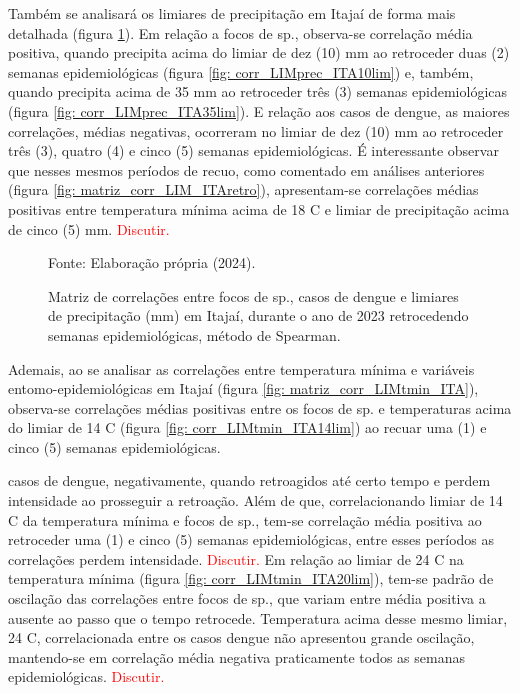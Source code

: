 \documentclass[
	12pt,				%
	openright,			%
	oneside,			%
	a4paper,			%
	english,			%
	french,				%
	spanish,			%
	brazil				%
	dvipsnames, table]{abntex2}
\begin{document}
\indent Também se analisará os limiares de precipitação em Itajaí de forma mais detalhada (figura \ref{fig: matriz_corr_LIMprec_ITA}). Em relação a focos de  sp., observa-se correlação média positiva, quando precipita acima do limiar de dez (10) mm ao retroceder duas (2) semanas epidemiológicas (figura \ref{fig: corr_LIMprec_ITA10lim}) e, também, quando precipita acima de 35 mm ao retroceder três (3) semanas epidemiológicas (figura \ref{fig: corr_LIMprec_ITA35lim}). E relação aos casos de dengue, as maiores correlações, médias negativas, ocorreram no limiar de dez (10) mm ao retroceder três (3), quatro (4) e cinco (5) semanas epidemiológicas. É interessante observar que nesses mesmos períodos de recuo, como comentado em análises anteriores (figura \ref{fig: matriz_corr_LIM_ITAretro}), apresentam-se correlações médias positivas entre temperatura mínima acima de 18 C e limiar de precipitação acima de cinco (5) mm. \textcolor{red}{Discutir.}

\begin{figure}[htbp]
    \begin{center}
    \caption{Matriz de correlações entre focos de  sp., casos de dengue e limiares de precipitação (mm) em Itajaí, durante o ano de 2023 retrocedendo semanas epidemiológicas, método de Spearman.}
    \label{fig: matriz_corr_LIMprec_ITA}
        \hfill
    \end{center}
    \small{Fonte: Elaboração própria (2024).}
\end{figure}

\indent Ademais, ao se analisar as correlações entre temperatura mínima e variáveis entomo-epidemiológicas em Itajaí (figura \ref{fig: matriz_corr_LIMtmin_ITA}), observa-se correlações médias positivas entre os focos de  sp. e temperaturas acima do limiar de 14 C (figura \ref{fig: corr_LIMtmin_ITA14lim}) ao recuar uma (1) e cinco (5) semanas epidemiológicas.


casos de dengue, negativamente, quando retroagidos até certo tempo e perdem intensidade ao prosseguir a retroação. Além de que, correlacionando limiar de 14 C da temperatura mínima e focos de  sp., tem-se correlação média positiva ao retroceder uma (1) e cinco (5) semanas epidemiológicas, entre esses períodos as correlações perdem intensidade. \textcolor{red}{Discutir.} Em relação ao limiar de 24 C na temperatura mínima (figura \ref{fig: corr_LIMtmin_ITA20lim}), tem-se padrão de oscilação das correlações entre focos de  sp., que variam entre média positiva a ausente ao passo que o tempo retrocede. Temperatura acima desse mesmo limiar, 24 C, correlacionada entre os casos dengue não apresentou grande oscilação, mantendo-se em correlação média negativa praticamente todos as semanas epidemiológicas. \textcolor{red}{Discutir.}
\end{document}
